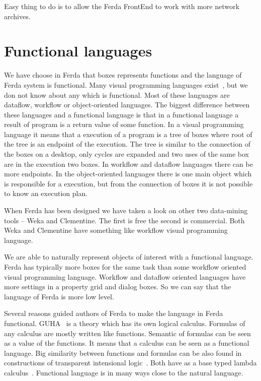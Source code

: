 \documentclass[a4paper,12pt]{book}
\begin{document}
Easy thing to do is to allow the Ferda FrontEnd to work with more network archives.


\section{Functional languages}
We have choose in Ferda that boxes represents functions and the language of Ferda system is functional. Many visual programming languages exist~\cite{WikiVisualProgrammingLaguage}, but we don not know about any which is functional. Most of these languages are dataflow, workflow or object-oriented languages. The biggest difference between these languages and a functional language is that in a functional language a result of program is a return value of some function. In a visual programming language it means that a execution of a program is a tree of boxes where root of the tree is an endpoint of the execution. The tree is similar to the connection of the boxes on a desktop, only cycles are expanded and two uses of the same box are in the execution two boxes. In workflow and dataflow languages there can be more endpoints. In the object-oriented languages there is one main object which is responsible for a execution, but from the connection of boxes it is not possible to know an execution plan.

When Ferda has been designed we have taken a look on other two data-mining tools -- Weka and Clementine. The first is free the second is commercial. Both Weka and Clementine have something like workflow visual programming language.

We are able to naturally represent objects of interest with a functional language. Ferda has typically more boxes for the same task than some workflow oriented visual programming language. Workflow and dataflow oriented languages have more settings in a property grid and dialog boxes. So we can say that the language of Ferda is more low level.

Several reasons guided authors of Ferda to make the language in Ferda functional. GUHA~\cite{GUHAbook} is a theory which has its own logical calculus. Formulas of any calculus are mostly written like functions. Semantic of formulas can be seen as a value of the functions. It means that a calculus can be seen as a functional language. Big similarity between functions and formulas can be also found in constructions of transparent intensional logic~\cite{webTIL}. Both have as a base typed lambda calculus~\cite{WikiLambdaCalculus}. Functional language is in many ways close to the natural language.
\end{document}
